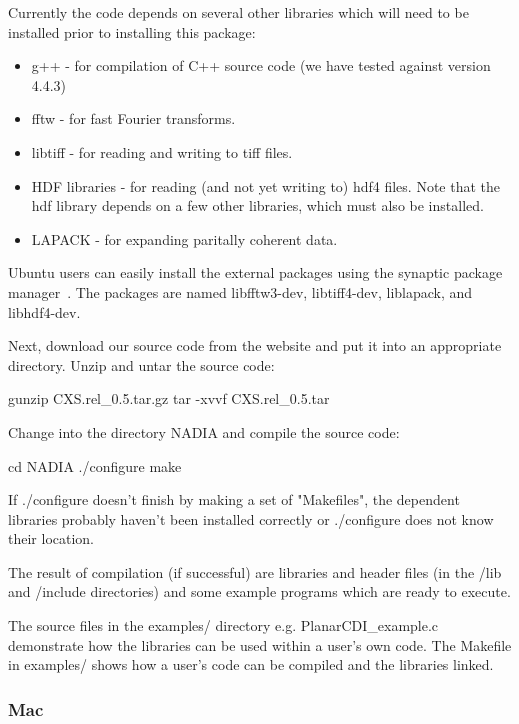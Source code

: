 \documentclass[]{cxs-software}
\begin{document}
Currently the code depends on several other libraries which will need to
be installed prior to installing this package:
\begin{itemize}
\item g++\cite{} - for compilation of C++ source code (we have tested against version 4.4.3)
\item fftw\cite{} - for fast Fourier transforms.
\item libtiff\cite{} - for reading and writing to tiff files.
\item HDF libraries\cite{} - for reading (and not yet writing to) hdf4
  files. Note that the hdf library depends on a few other libraries,
  which must also be installed.
\item LAPACK\cite{} - for expanding paritally coherent data.
\end{itemize}

Ubuntu users can easily install the external packages using the
synaptic package manager~\cite{}. The packages are named libfftw3-dev,
libtiff4-dev, liblapack, and libhdf4-dev.

Next, download our source code from the website and put it into an
appropriate directory. Unzip and untar the source code:
\begin{myverbatim}
  gunzip CXS.rel_0.5.tar.gz 
  tar -xvvf CXS.rel_0.5.tar
\end{myverbatim}

Change into the directory NADIA and compile the source code: 
\begin{myverbatim}
  cd NADIA
  ./configure 
  make
\end{myverbatim}

If ./configure doesn't finish by making a set of "Makefiles", the
dependent libraries probably haven't been installed correctly or
./configure does not know their location.

The result of compilation (if successful) are libraries and header
files (in the /lib and /include directories) and some example programs
which are ready to execute.

The source files in the examples/ directory e.g. PlanarCDI\_example.c
demonstrate how the libraries can be used within a user's own
code. The Makefile in examples/ shows how a user's code can be
compiled and the \name libraries linked.

\subsubsection{Mac}
\end{document}
